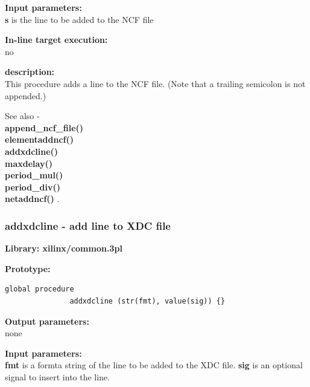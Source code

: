             {\bf Input parameters:} \\            
            {\bf s} is the line to be added to the NCF file
        
            {\bf In-line target execution:} \\
            no

            {\bf description:} \\
            This procedure adds a line to the NCF file.
            (Note that a trailing semicolon is not appended.)

            See also - \\
            {\bf append\_ncf\_file()} \\
            {\bf elementaddncf()} \\
            {\bf addxdcline()} \\
            {\bf maxdelay()} \\
            {\bf period\_mul()} \\
            {\bf period\_div()} \\
            {\bf netaddncf()} .



        \subsubsection{addxdcline - add line to XDC file}\label{sec:lpaddxdcline}
            
            {\bf Library: xilinx/common.3pl}

            {\bf Prototype:} \\
            \vsp
            \begin{lstlisting}[gobble=12, language=threepl]
               global procedure
               addxdcline (str(fmt), value(sig)) {}
            \end{lstlisting}

            {\bf Output parameters:} \\
            none

            {\bf Input parameters:} \\            
            {\bf fmt} is a formta string of the line to be added to the XDC file.
            {\bf sig} is an optional signal to insert into the line.
        
